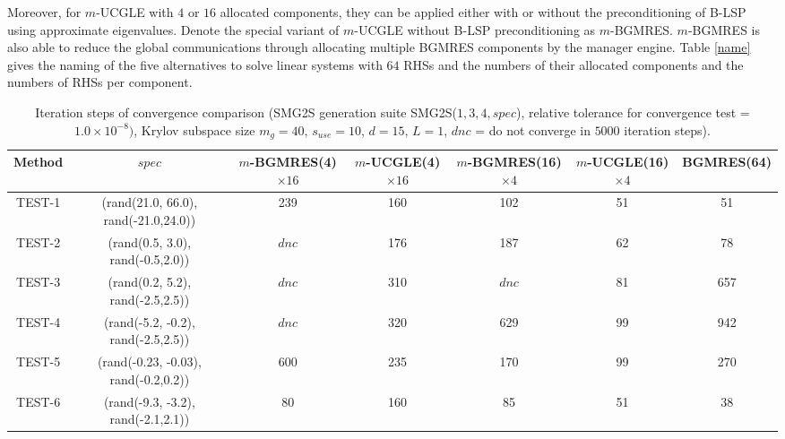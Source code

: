 Moreover, for $m$-UCGLE with $4$ or $16$ allocated components, they can be applied either with or without the preconditioning of B-LSP using approximate eigenvalues. Denote the special variant of $m$-UCGLE without B-LSP preconditioning as $m$-BGMRES. $m$-BGMRES is also able to reduce the global communications through allocating multiple BGMRES components by the manager engine. Table \ref{name} gives the naming of the five alternatives to solve linear systems with $64$ RHSs and the numbers of their allocated components and the numbers of RHSs per component.

\begin{table} %
	\footnotesize
	\caption{Iteration steps of convergence comparison (SMG2S generation suite SMG2S($1,3,4, spec$), relative tolerance for convergence test = $1.0\times10^{-8})$, Krylov subspace size $m_g = 40$, $s_{use} = 10$, $d=15$, $L = 1$, $dnc$ = do not converge in $5000$ iteration steps).}
	\centering
	\renewcommand{\arraystretch}{1.6}
	\begin{tabular}{c*{6}{c}}
		\toprule
		Method            & $spec$ & $m$-BGMRES(4)$\times 16$  & $m$-UCGLE(4)$\times 16$   &  $m$-BGMRES(16)$\times 4$ &  $m$-UCGLE(16)$\times 4$ &  BGMRES(64) \\
		\hline
		TEST-1 &(rand(21.0, 66.0), rand(-21.0,24.0))& \cellcolor{blue!20}239 & 160 & 102 & \cellcolor{red!20}51 & \cellcolor{red!20}51\\
		TEST-2   &   (rand(0.5, 3.0), rand(-0.5,2.0))      &\cellcolor{blue!20}$dnc$  & 176 & 187 & \cellcolor{red!20}62 & 78 \\
		TEST-3    &     (rand(0.2, 5.2), rand(-2.5,2.5))    & \cellcolor{blue!20}$dnc$  & 310 & \cellcolor{blue!20}$dnc$  & \cellcolor{red!20}81 &657 \\
		TEST-4    & (rand(-5.2, -0.2), rand(-2.5,2.5))  & \cellcolor{blue!20}$dnc$  & 320 & 629 & \cellcolor{red!20}99 & 942\\
		TEST-5    &  (rand(-0.23, -0.03), rand(-0.2,0.2))  &\cellcolor{blue!20} 600 & 235 & 170 &\cellcolor{red!20} 99 & 270 \\
		TEST-6    &  (rand(-9.3, -3.2), rand(-2.1,2.1))  & 80 & \cellcolor{blue!20}160 & 85 & 51 & \cellcolor{red!20}38 \\
		\hline
	\end{tabular}
	
	\vspace{5\baselineskip}
	

\end{table}
